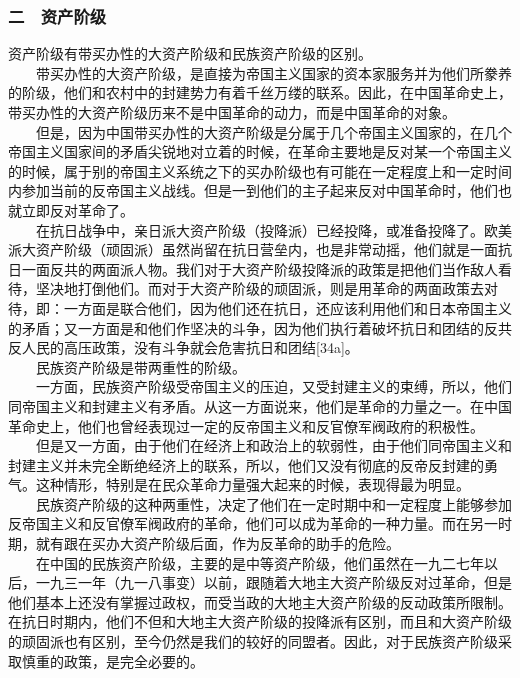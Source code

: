 \documentclass[cn,11pt,chinese]{elegantbook}
\def\myformat#1{\hfil\hfil #1}
\begin{document}
\subsubsection*{\myformat{二　资产阶级}}
资产阶级有带买办性的大资产阶级和民族资产阶级的区别。\\
　　带买办性的大资产阶级，是直接为帝国主义国家的资本家服务并为他们所豢养的阶级，他们和农村中的封建势力有着千丝万缕的联系。因此，在中国革命史上，带买办性的大资产阶级历来不是中国革命的动力，而是中国革命的对象。\\
　　但是，因为中国带买办性的大资产阶级是分属于几个帝国主义国家的，在几个帝国主义国家间的矛盾尖锐地对立着的时候，在革命主要地是反对某一个帝国主义的时候，属于别的帝国主义系统之下的买办阶级也有可能在一定程度上和一定时间内参加当前的反帝国主义战线。但是一到他们的主子起来反对中国革命时，他们也就立即反对革命了。\\
　　在抗日战争中，亲日派大资产阶级（投降派）已经投降，或准备投降了。欧美派大资产阶级（顽固派）虽然尚留在抗日营垒内，也是非常动摇，他们就是一面抗日一面反共的两面派人物。我们对于大资产阶级投降派的政策是把他们当作敌人看待，坚决地打倒他们。而对于大资产阶级的顽固派，则是用革命的两面政策去对待，即：一方面是联合他们，因为他们还在抗日，还应该利用他们和日本帝国主义的矛盾；又一方面是和他们作坚决的斗争，因为他们执行着破坏抗日和团结的反共反人民的高压政策，没有斗争就会危害抗日和团结[34a]。\\
　　民族资产阶级是带两重性的阶级。\\
　　一方面，民族资产阶级受帝国主义的压迫，又受封建主义的束缚，所以，他们同帝国主义和封建主义有矛盾。从这一方面说来，他们是革命的力量之一。在中国革命史上，他们也曾经表现过一定的反帝国主义和反官僚军阀政府的积极性。\\
　　但是又一方面，由于他们在经济上和政治上的软弱性，由于他们同帝国主义和封建主义并未完全断绝经济上的联系，所以，他们又没有彻底的反帝反封建的勇气。这种情形，特别是在民众革命力量强大起来的时候，表现得最为明显。\\
　　民族资产阶级的这种两重性，决定了他们在一定时期中和一定程度上能够参加反帝国主义和反官僚军阀政府的革命，他们可以成为革命的一种力量。而在另一时期，就有跟在买办大资产阶级后面，作为反革命的助手的危险。\\
　　在中国的民族资产阶级，主要的是中等资产阶级，他们虽然在一九二七年以后，一九三一年（九一八事变）以前，跟随着大地主大资产阶级反对过革命，但是他们基本上还没有掌握过政权，而受当政的大地主大资产阶级的反动政策所限制。在抗日时期内，他们不但和大地主大资产阶级的投降派有区别，而且和大资产阶级的顽固派也有区别，至今仍然是我们的较好的同盟者。因此，对于民族资产阶级采取慎重的政策，是完全必要的。\\
\end{document}
